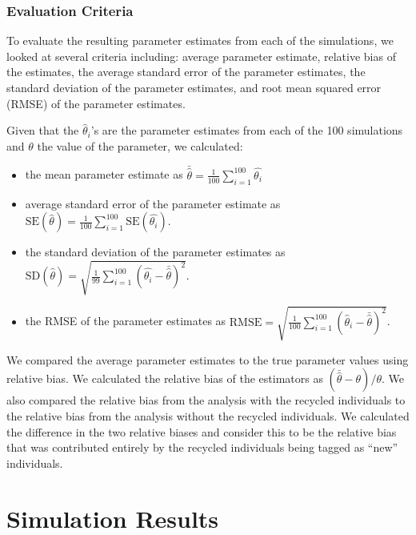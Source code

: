 \documentclass[12pt]{article}
\providecommand{\tightlist}{%
  \setlength{\itemsep}{0pt}\setlength{\parskip}{0pt}}
\begin{document}
\subsubsection{Evaluation Criteria}\label{evaluation-criteria}

To evaluate the resulting parameter estimates from each of the simulations, we looked at several criteria including: average parameter
estimate, relative bias of the estimates, the average standard error of
the parameter estimates, the standard deviation of the parameter
estimates, and root mean squared error (RMSE) of the parameter
estimates.

Given that the \(\hat{\theta}_i\)'s are the parameter estimates from each of
the 100 simulations and $\theta$ the value of the parameter, we calculated:

\begin{itemize}
\tightlist
\item
  the mean parameter estimate as
  \(\bar{\hat{\theta}}= \frac{1}{100} \sum_{i=1}^{100} \hat{\theta_i}\)
\item
  average standard error of the parameter estimate as
  \(\text{SE}(\hat{\theta})= \frac{1}{100} \sum_{i=1}^{100} \text{SE}(\hat{\theta_i})\).
\item
  the standard deviation of the parameter estimates as
  \(\text{SD}(\hat{\theta})= \sqrt{\frac{1}{99} \sum_{i=1}^{100} (\hat{\theta_i}-\bar{\hat{\theta}})^2}\).
\item
  the RMSE of the parameter estimates as
  \(\text{RMSE}= \sqrt{\frac{1}{100} \sum_{i=1}^{100} (\hat{\theta}_i-\bar{\hat{\theta}})^2} \).
\end{itemize}

We compared the average parameter estimates  to the true parameter
values using relative bias. We calculated the relative bias of the
estimators as \((\bar{\hat{\theta}} -\theta)/\theta\). We also
compared the relative bias from the analysis with the recycled
individuals to the relative bias from the analysis without the recycled
individuals. We calculated the difference in the two relative biases and
consider this to be the relative bias that was contributed entirely by the
recycled individuals being tagged as ``new'' individuals.




\section{Simulation Results}\label{results}
\end{document}
